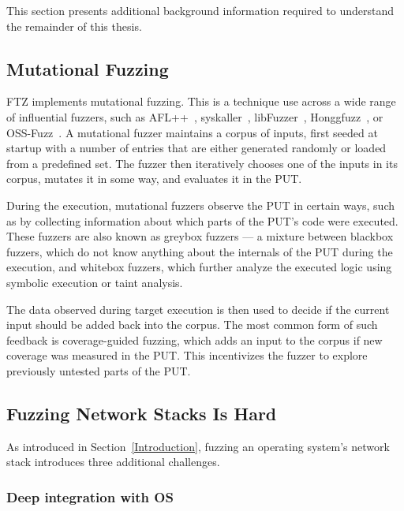 \documentclass{article}
\newcommand{\proj}{FTZ\xspace}
\let\savedCite=\cite
\renewcommand{\cite}{\unskip~\savedCite}
\begin{document}
\begin{multicols}{2}
  This section presents additional background information required to understand the remainder of this thesis.

  \subsection{Mutational Fuzzing}

  \label{Background:MutationalFuzzing}
  \proj implements mutational fuzzing. This is a technique use across a wide range of influential fuzzers, such as AFL++\cite{AFLPlusPlus}, syskaller\cite{syskaller}, libFuzzer\cite{libFuzzer}, Honggfuzz\cite{hongfuzz}, or OSS-Fuzz\cite{OSSFuzz}. A mutational fuzzer maintains a corpus of inputs, first seeded at startup with a number of entries that are either generated randomly or loaded from a predefined set. The fuzzer then iteratively chooses one of the inputs in its corpus, mutates it in some way, and evaluates it in the PUT.

  During the execution, mutational fuzzers observe the PUT in certain ways, such as by collecting information about which parts of the PUT's code were executed. These fuzzers are also known as greybox fuzzers — a mixture between blackbox fuzzers, which do not know anything about the internals of the PUT during the execution, and whitebox fuzzers, which further analyze the executed logic using symbolic execution or taint analysis.\cite{EVA}

  The data observed during target execution is then used to decide if the current input should be added back into the corpus. The most common form of such feedback is coverage-guided fuzzing, which adds an input to the corpus if new coverage was measured in the PUT. This incentivizes the fuzzer to explore previously untested parts of the PUT.\cite{AFLPlusPlus}

  \subsection{Fuzzing Network Stacks Is Hard}
  \label{Background:FuzzingNetworkStacksIsHard}

  As introduced in Section~\ref{Introduction}, fuzzing an operating system's network stack introduces three additional challenges.

  \subsubsection{Deep integration with OS}


\end{multicols}
\end{document}
